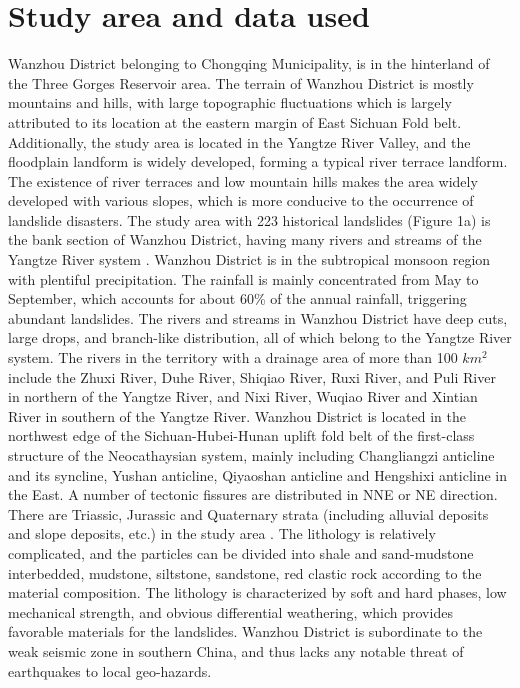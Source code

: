 \documentclass[a4paper,fleqn]{cas-sc}
\begin{document}
\section{Study area and data used}

Wanzhou District belonging to Chongqing Municipality, is in the hinterland of the Three Gorges Reservoir area. 
The terrain of Wanzhou District is mostly mountains and hills, with large topographic fluctuations which is largely attributed to its location at the eastern margin of East Sichuan Fold belt. 
Additionally, the study area is located in the Yangtze River Valley, and the floodplain landform is widely developed, forming a typical river terrace landform. The existence of river terraces and low mountain hills makes the area widely developed with various slopes, which is more conducive to the occurrence of landslide disasters.
The study area with 223 historical landslides (Figure 1a) is the bank section of Wanzhou District, having many rivers and streams of the Yangtze River system \citep{Yu2016IJERPH,Song2018}. 
Wanzhou District is in the subtropical monsoon region with plentiful precipitation. 
The rainfall is mainly concentrated from May to September, which accounts for about 60\% of the annual rainfall, triggering abundant landslides. 
The rivers and streams in Wanzhou District have deep cuts, large drops, and branch-like distribution, all of which belong to the Yangtze River system. 
The rivers in the territory with a drainage area of more than 100 $km^{2}$ include the Zhuxi River, Duhe River, Shiqiao River, Ruxi River, and Puli River in northern of the Yangtze River, and Nixi River, Wuqiao River and Xintian River in southern of the Yangtze River. 
Wanzhou District is located in the northwest edge of the Sichuan-Hubei-Hunan uplift fold belt of the first-class structure of the Neocathaysian system, mainly including Changliangzi anticline and its syncline, Yushan anticline, Qiyaoshan anticline and Hengshixi anticline in the East. 
A number of tectonic fissures are distributed in NNE or NE direction. There are Triassic, Jurassic and Quaternary strata (including alluvial deposits and slope deposits, etc.) in the study area \citep{Song2018}. 
The lithology is relatively complicated, and the particles can be divided into shale and sand-mudstone interbedded, mudstone, siltstone, sandstone, red clastic rock according to the material composition. 
The lithology is characterized by soft and hard phases, low mechanical strength, and obvious differential weathering, which provides favorable materials for the landslides. 
Wanzhou District is subordinate to the weak seismic zone in southern China, and thus lacks any notable threat of earthquakes to local geo-hazards. 
\end{document}
